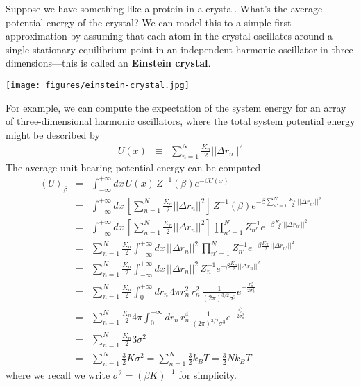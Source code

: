 \documentclass[english,course]{lecture}
\begin{document}
Suppose we have something like a protein in a crystal.
What's the average potential energy of the crystal?
We can model this to a simple first approximation by assuming that each atom in the crystal oscillates around a single stationary equilibrium point in an independent harmonic oscillator in three dimensions---this is called an {\bf Einstein crystal}.

\begin{centering}
\texttt{[image: figures/einstein-crystal.jpg]}

\end{centering}

For example, we can compute the expectation of the system energy for an array of three-dimensional harmonic oscillators, where the total system potential energy might be described by
\begin{eqnarray}
U(x) &\equiv& \sum_{n=1}^N \frac{K_n}{2} ||\Delta r_n||^2
\end{eqnarray}
The average unit-bearing potential energy can be computed 
\begin{eqnarray}
\left< U \right>_\beta &=& \int_{-\infty}^{+\infty} dx \, U(x) \, Z^{-1}(\beta) e^{-\beta U(x)} \\
&=& \int_{-\infty}^{+\infty} dx \, \left[ \sum_{n=1}^N \frac{K_n}{2} ||\Delta r_n||^2 \right] \, Z^{-1}(\beta) e^{-\beta \sum_{n'=1}^N \frac{K_{n'}}{2} ||\Delta r_{n'}||^2} \\
&=& \int_{-\infty}^{+\infty} dx \, \left[ \sum_{n=1}^N \frac{K_n}{2} ||\Delta r_n||^2 \right] \, \prod_{n'=1}^N Z_{n'}^{-1} e^{-\beta \frac{K_{n'}}{2} ||\Delta r_{n'}||^2} \\
&=& \sum_{n=1}^N \frac{K_n}{2} \int_{-\infty}^{+\infty} dx \, ||\Delta r_n||^2 \, \prod_{n'=1}^N Z_{n'}^{-1} e^{-\beta \frac{K_{n'}}{2} ||\Delta r_{n'}||^2} \\
&=& \sum_{n=1}^N \frac{K_n}{2} \int_{-\infty}^{+\infty} dx \, ||\Delta r_n||^2 \,  Z_{n}^{-1} e^{-\beta \frac{K_{n}}{2} ||\Delta r_{n}||^2} \\
&=& \sum_{n=1}^N \frac{K_n}{2} \int_0^{+\infty} dr_n \, 4 \pi r_n^2 \, r_n^2 \,  \frac{1}{(2 \pi)^{3/2} \sigma^3} e^{-\frac{r_n^2}{2 \sigma_n^2}} \\
&=& \sum_{n=1}^N \frac{K_n}{2} 4 \pi \int_0^{+\infty} dr_n \, r_n^4 \,  \frac{1}{(2 \pi)^{3/2} \sigma^3} e^{-\frac{r_n^2}{2 \sigma_n^2}} \\
&=& \sum_{n=1}^N \frac{K_n}{2} 3 \sigma^2 \\
&=& \sum_{n=1}^N \frac{3}{2} K \sigma^2 = \sum_{n=1}^N \frac{3}{2} k_B T = \frac{3}{2} N k_B T 
\end{eqnarray}
where we recall we write $\sigma^2 = (\beta K)^{-1}$ for simplicity.
\end{document}
